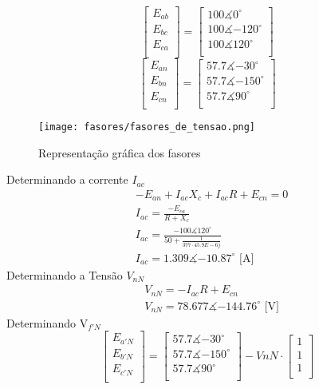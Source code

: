 \documentclass[a4paper, 12pt]{article}
\begin{document}
			\[\begin{bmatrix}
				E_{ab} \\
				E_{bc} \\
				E_{ca} \\
			\end{bmatrix}
			=
			\begin{bmatrix}
				100\measuredangle{0^\circ} \\
				100\measuredangle{-120^\circ} \\
				100\measuredangle{120^\circ} \\
			\end{bmatrix}
			\]
			  \[\begin{bmatrix}
				E_{an} \\
				E_{bn} \\
				E_{cn} \\
			\end{bmatrix}
			=
			\begin{bmatrix}
				57.7\measuredangle{-30^\circ} \\
				57.7\measuredangle{-150^\circ} \\
				57.7\measuredangle{90^\circ} \\
			\end{bmatrix}
			\]
			\begin{figure}[H]
				\centering %
				\texttt{[image: fasores/fasores\_de\_tensao.png]}
				\caption{Representação gráfica dos fasores }
			\end{figure}
			Determinando a corrente $I_{ac}$
		\[ \begin{split}
            &- E_{an} + I_{ac}X_c + I_{ac}R + E_{cn} = 0 \\
            &I_{ac} = \frac{-E_{ca}}{R+X_c}\\
            &I_{ac} = \frac{-100\measuredangle{ 120^\circ} }{50+\frac{1}{377\cdot 45.9E-6j}} \\
            &I_{ac} = 1.309 \measuredangle{-10.87^\circ} \text{ [A]}
        \end{split}
        \]
        	Determinando a Tensão $V_{nN}$
		\[ \begin{split}
            &V_{nN} = - I_{ac}R + E_{cn}  \\
            &V_{nN} = 78.677 \measuredangle{-144.76^\circ} \text{ [V]}
        \end{split}
        \]
        Determinando V$_{f'N}$
          \[\begin{bmatrix}
				E_{a'N} \\
				E_{b'N} \\
				E_{c'N} \\
			\end{bmatrix}
			=
			\begin{bmatrix}
				57.7\measuredangle{-30^\circ} \\
				57.7\measuredangle{-150^\circ} \\
				57.7\measuredangle{90^\circ} \\
			\end{bmatrix}
			-VnN \cdot \begin{bmatrix}
				1\\
				1\\
				1\\
			\end{bmatrix}
			\]
\end{document}
